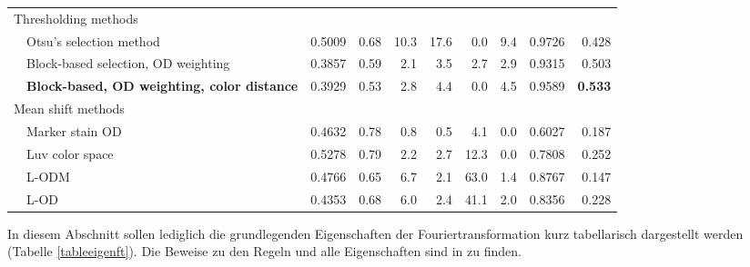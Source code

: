 \begin{table}[ht]
\begin{tabular}{p{3mm}p{4cm}*{8}{r}}
\multicolumn{10}{l}{Thresholding methods}\\
                 &  Otsu's selection method &            0.5009 &             0.68 &           10.3 &          17.6 &              0.0 &               9.4 &      0.9726 &       0.428 \\
      & Block-based selection, OD weighting &            0.3857 &             0.59 &            2.1 &           3.5 &              2.7 &               2.9 &      0.9315 &       0.503 \\
  & \textbf{Block-based, OD weighting, color distance} &            0.3929 &             0.53 &            2.8 &           4.4 &              0.0 &               4.5 &      0.9589 &       \textbf{0.533} \\
\multicolumn{10}{l}{Mean shift methods}\\
                         &  Marker stain OD &            0.4632 &             0.78 &            0.8 &           0.5 &              4.1 &               0.0 &      0.6027 &       0.187 \\
                          & Luv color space &            0.5278 &             0.79 &            2.2 &           2.7 &             12.3 &               0.0 &      0.7808 &       0.252 \\
                                   &  L-ODM &            0.4766 &             0.65 &            6.7 &           2.1 &             63.0 &               1.4 &      0.8767 &       0.147 \\
                                    &  L-OD &            0.4353 &             0.68 &            6.0 &           2.4 &             41.1 &               2.0 &      0.8356 &       0.228 \\
\bottomrule
\end{tabular}
\end{table}


\newpage

In   diesem   Abschnitt   sollen lediglich   die   grundlegenden
Eigenschaften  der  Fouriertransformation kurz tabellarisch dargestellt werden
(Tabelle  \ref{tableeigenft}). Die  Beweise zu den Regeln und  alle  Eigenschaften
sind in \cite{Aach2005} zu finden.

